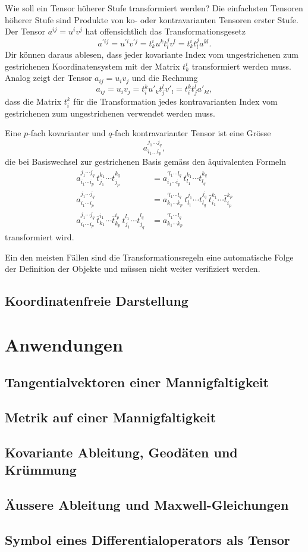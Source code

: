 Wie soll ein Tensor höherer Stufe transformiert werden?
Die einfachsten Tensoren höherer Stufe sind Produkte von
ko- oder kontravarianten Tensoren erster Stufe.
Der Tensor $a^{ij}=u^iv^j$ hat offensichtlich das Transformationsgesetz
\[
a^{\prime ij}
=
u^{\prime i}v^{\prime j}
=
t^i_k u^k
t^j_l v^l
=
t^i_k
t^j_l
a^{kl}.
\]
Dir können daraus ablesen, dass jeder kovariante Index
vom ungestrichenen zum gestrichenen Koordinatensystem mit der Matrix
$t^i_k$ transformiert werden muss.
Analog zeigt der Tensor $a_{ij}=u_iv_j$ und die Rechnung
\[
a_{ij}
=
u_iv_j
=
t_i^k u'_k
t_j^l v'_l
=
t_i^k
t_j^l a'_{kl},
\]
dass die Matrix $t_i^k$ für die Transformation jedes kontravarianten 
Index vom gestrichenen zum ungestrichenen verwendet werden muss.

\begin{definition}
Eine $p$-fach kovarianter und $q$-fach kontravarianter Tensor ist
eine Grösse
\[
a_{i_1\dots i_p}^{j_1\dots j_q},
\]
die bei Basiswechsel zur gestrichenen Basis gemäss den äquivalenten Formeln
\begin{align*}
a_{i_1\cdots i_p}^{j_1\cdots j_q}
\,
t_{j_1}^{k_1}
\cdots
t_{j_p}^{k_q}
&=
a_{i_1\cdots i_p}^{\prime l_1\cdots l_q}
\,
t_{l_1}^{k_1}
\cdots
t_{l_q}^{k_q}
\\
a_{i_1\cdots i_p}^{j_1\cdots j_q}
&=
a_{k_1\cdots k_p}^{\prime l_1\cdots l_q}
\,
t_{l_1}^{j_1}\cdots t_{l_q}^{j_q}
\,
\bar t_{i_1}^{k_1}\cdots \bar t_{i_p}^{k_p}
\\
a_{i_1\cdots i_p}^{j_1\cdots j_q}
\,
\bar t_{k_1}^{i_1}\cdots \bar t_{k_p}^{i_p}
\,
t_{j_1}^{l_1}\cdots t_{j_q}^{l_q}
&=
a_{k_1\cdots k_p}^{\prime l_1\cdots l_q}
\end{align*}
transformiert wird.
\end{definition}

Ein den meisten Fällen sind die Transformationsregeln eine automatische
Folge der Definition der Objekte und müssen nicht weiter verifiziert werden.

\subsection{Koordinatenfreie Darstellung}

\section{Anwendungen}

\subsection{Tangentialvektoren einer Mannigfaltigkeit}
\subsection{Metrik auf einer Mannigfaltigkeit}
\subsection{Kovariante Ableitung, Geodäten und Krümmung}
\subsection{Äussere Ableitung und Maxwell-Gleichungen}
\subsection{Symbol eines Differentialoperators als Tensor}

